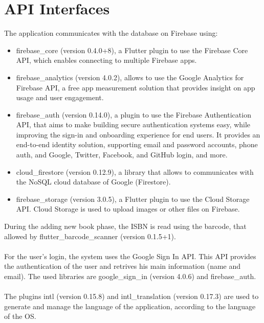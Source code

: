 \section{API Interfaces}
The application communicates with the database on Firebase using:
\begin{itemize}
    \item
    firebase\_core (version 0.4.0+8), a Flutter plugin to use the Firebase Core API, which enables connecting to multiple Firebase apps.
    \item
    firebase\_analytics (version 4.0.2), allows to use the Google Analytics for Firebase API, a free app measurement solution that provides insight on app usage and user engagement.
    \item
    firebase\_auth (version 0.14.0), a plugin to use the Firebase Authentication API, that aims to make building secure authentication systems easy, while improving the sign-in and onboarding experience for end users. It provides an end-to-end identity solution, supporting email and password accounts, phone auth, and Google, Twitter, Facebook, and GitHub login, and more.
    \item
    cloud\_firestore (version 0.12.9), a library that allows to communicates with the NoSQL cloud database of Google (Firestore).
    \item
    firebase\_storage (version 3.0.5), a Flutter plugin to use the Cloud Storage API. Cloud Storage is used to upload images or other files on Firebase.
\end{itemize}
During the adding new book phase, the ISBN is read using the barcode, that allowed by flutter\_barcode\_scanner (version 0.1.5+1).
\\
\\
For the user's login, the system uses the Google Sign In API. This API provides the authentication of the user and retrives his main information (name and email).
The used libraries are google\_sign\_in (version 4.0.6) and firebase\_auth.
\\
\\
The plugins intl (version 0.15.8) and intl\_translation (version 0.17.3) are used to generate and manage the language of the application, according to the language of the OS.